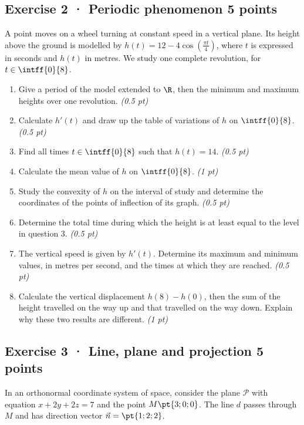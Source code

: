 \subsection*{Exercise 2 · Periodic phenomenon \hfill 5 points}A point moves on a wheel turning at constant speed in a vertical plane. Its height above the ground is modelled by $h(t)=12-4\cos\left(\frac{\pi t}{4}\right)$, where $t$ is expressed in seconds and $h(t)$ in metres. We study one complete revolution, for $t\in\intff{0}{8}$.

\begin{enumerate}

\item Give a period of the model extended to $\R$, then the minimum and maximum heights over one revolution. \hfill\textit{(0.5 pt)}

\item Calculate $h'(t)$ and draw up the table of variations of $h$ on $\intff{0}{8}$. \hfill\textit{(0.5 pt)}

\item Find all times $t\in\intff{0}{8}$ such that $h(t)=14$. \hfill\textit{(0.5 pt)}

\item Calculate the mean value of $h$ on $\intff{0}{8}$. \hfill\textit{(1 pt)}

\item Study the convexity of $h$ on the interval of study and determine the coordinates of the points of inflection of its graph. \hfill\textit{(0.5 pt)}

\item Determine the total time during which the height is at least equal to the level in question 3. \hfill\textit{(0.5 pt)}

\item The vertical speed is given by $h'(t)$. Determine its maximum and minimum values, in metres per second, and the times at which they are reached. \hfill\textit{(0.5 pt)}

\item Calculate the vertical displacement $h(8)-h(0)$, then the sum of the height travelled on the way up and that travelled on the way down. Explain why these two results are different. \hfill\textit{(1 pt)}

\end{enumerate}

\mxnewpage{}

\subsection*{Exercise 3 · Line, plane and projection \hfill 5 points}In an orthonormal coordinate system of space, consider the plane $\mathcal P$ with equation $x+2y+2z=7$ and the point $M\pt{3;0;0}$. The line $d$ passes through $M$ and has direction vector $\vec n=\pt{1;2;2}$.

